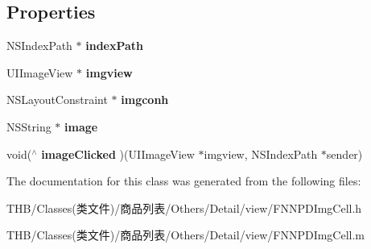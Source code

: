 \subsection*{Properties}
\begin{DoxyCompactItemize}
\item 
\mbox{\label{interface_f_n_n_p_d_img_cell_aa81ad280858fd6e5e3b68407fa89ea12}} 
N\+S\+Index\+Path $\ast$ {\bfseries index\+Path}
\item 
\mbox{\label{interface_f_n_n_p_d_img_cell_abaac0a50596fbfdd1ab908754cd204eb}} 
U\+I\+Image\+View $\ast$ {\bfseries imgview}
\item 
\mbox{\label{interface_f_n_n_p_d_img_cell_abd63d7084b6c2dcb063c0396821da6f2}} 
N\+S\+Layout\+Constraint $\ast$ {\bfseries imgconh}
\item 
\mbox{\label{interface_f_n_n_p_d_img_cell_a06ef26f0f21ea0f7f902077f738cc8ad}} 
N\+S\+String $\ast$ {\bfseries image}
\item 
\mbox{\label{interface_f_n_n_p_d_img_cell_ad56cfb9cb8a8afcc62f0509c2b4275ce}} 
void($^\wedge$ {\bfseries image\+Clicked} )(U\+I\+Image\+View $\ast$imgview, N\+S\+Index\+Path $\ast$sender)
\end{DoxyCompactItemize}


The documentation for this class was generated from the following files\+:\begin{DoxyCompactItemize}
\item 
T\+H\+B/\+Classes(类文件)/商品列表/\+Others/\+Detail/view/F\+N\+N\+P\+D\+Img\+Cell.\+h\item 
T\+H\+B/\+Classes(类文件)/商品列表/\+Others/\+Detail/view/F\+N\+N\+P\+D\+Img\+Cell.\+m\end{DoxyCompactItemize}
